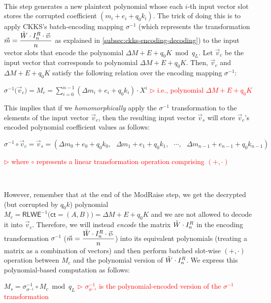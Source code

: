 $ $

 This step generates a new plaintext polynomial whose each $i$-th input vector slot stores the corrupted coefficient $(m_i + e_i + q_0k_i)$. The trick of doing this is to apply CKKS's batch-encoding mapping $\sigma^{-1}$ (which represents the transformation $\vec{m} = \dfrac{\tilde W \cdot I_n^R \cdot \vec{v}_{'}}{n}$ as explained in \autoref{subsec:ckks-encoding-decoding}) to the input vector slots that encode the polynomial $\Delta M + E + q_0 K \bmod q_L$. Let $\vec{v}_c$ be the input vector that corresponds to polynomial $\Delta M + E + q_0 K$. Then, $\vec{v}_c$ and $\Delta M + E + q_0 K$ satisfy the following relation over the encoding mapping $\sigma^{-1}$: 

$\sigma^{-1}\bm(\vec{v}_c\bm) = M_c = \sum\limits_{i=0}^{n-1}(\Delta m_i + e_i + q_0k_i)\cdot X^{i}$ \textcolor{red}{ $\rhd$ i.e., polynomial $\Delta M + E + q_0K$} 

This implies that if we \textit{homomorphically} apply the $\sigma^{-1}$ transformation to the elements of the input vector $\vec{v}_c$, then the resulting input vector $\vec{v}_s$ will store $\vec{v}_c$'s encoded polynomial coefficient values as follows:

$\sigma^{-1} \circ \vec{v}_c = \vec{v}_s = (\Delta m_0 + e_0 + q_0k_0, \text{ } \Delta m_1 + e_1 + q_0k_1, \text{ } \cdots, \text{ } \Delta m_{n-1} + e_{n-1} + q_0k_{n-1})$  

\textcolor{red}{ $\rhd$ where $\circ$ represents a linear transformation operation comprising $(+, \cdot)$}

$ $




However, remember that at the end of the \textsf{ModRaise} step, we get the decrypted (but corrupted by $q_0k$) polynomial $M_c = \textsf{RLWE}^{-1}\textbf{(}\textsf{ct} = (A, B)\bm) = \Delta M + E + q_0K$ and we are not allowed to decode it into $\vec{v}_c$. Therefore, we will instead \textit{encode} the matrix $\tilde W \cdot I_n^R$ in the encoding transformation $\sigma^{-1}$ ($\vec{m} = \dfrac{\tilde W \cdot I_n^R \cdot \vec{v}_{'}}{n}$) into its equivalent polynomials (treating a matrix as a combination of vectors) and then perform batched slot-wise $(+, \cdot)$ operation between $M_c$ and the polynomial version of $\tilde W \cdot I_n^R$. We express this polynomial-based computation as follows:

$M_s = \sigma^{-1}_{\sigma^{-1}} \circ M_c \bmod q_L$
\textcolor{red}{ $\rhd$ $\sigma^{-1}_{\sigma^{-1}}$ is the polynomial-encoded version of the $\sigma^{-1}$ transformation}

